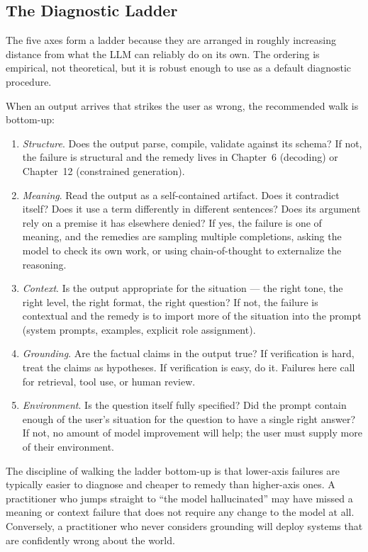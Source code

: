 \subsection{The Diagnostic Ladder}

The five axes form a ladder because they are arranged in roughly
increasing distance from what the LLM can reliably do on its own.
The ordering is empirical, not theoretical, but it is robust enough
to use as a default diagnostic procedure.

When an output arrives that strikes the user as wrong, the
recommended walk is bottom-up:
\begin{enumerate}
  \item \emph{Structure}. Does the output parse, compile, validate
        against its schema? If not, the failure is structural and
        the remedy lives in Chapter~6 (decoding) or Chapter~12
        (constrained generation).
  \item \emph{Meaning}. Read the output as a self-contained
        artifact. Does it contradict itself? Does it use a term
        differently in different sentences? Does its argument rely
        on a premise it has elsewhere denied? If yes, the failure
        is one of meaning, and the remedies are sampling multiple
        completions, asking the model to check its own work, or
        using chain-of-thought to externalize the reasoning.
  \item \emph{Context}. Is the output appropriate for the
        situation --- the right tone, the right level, the right
        format, the right question? If not, the failure is
        contextual and the remedy is to import more of the
        situation into the prompt (system prompts, examples,
        explicit role assignment).
  \item \emph{Grounding}. Are the factual claims in the output
        true? If verification is hard, treat the claims as
        hypotheses. If verification is easy, do it. Failures here
        call for retrieval, tool use, or human review.
  \item \emph{Environment}. Is the question itself fully specified?
        Did the prompt contain enough of the user's situation for
        the question to have a single right answer? If not, no
        amount of model improvement will help; the user must
        supply more of their environment.
\end{enumerate}

The discipline of walking the ladder bottom-up is that lower-axis
failures are typically easier to diagnose and cheaper to remedy
than higher-axis ones. A practitioner who jumps straight to ``the
model hallucinated'' may have missed a meaning or context failure
that does not require any change to the model at all. Conversely,
a practitioner who never considers grounding will deploy systems
that are confidently wrong about the world.

